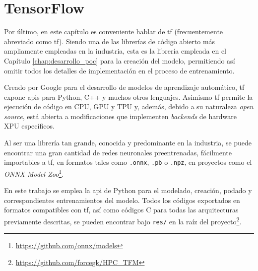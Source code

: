\section{TensorFlow}
\label{sec:tensorflow}
Por último, en este capítulo es conveniente hablar de \acrlong{tf} (frecuentemente abreviado como \acrshort{tf}). Siendo una de las librerías de código abierto más ampliamente empleadas en la industria, esta es la librería empleada en el Capítulo \ref{chap:desarrollo_poc} para la creación del modelo, permitiendo así omitir todos los detalles de implementación en el proceso de entrenamiento.

Creado por Google para el desarrollo de modelos de aprendizaje automático, \acrlong{tf} expone \acrshort{api}s para Python, C++ y muchos otros lenguajes. Asimismo \acrlong{tf} permite la ejecución de código en CPU, GPU y TPU y, además, debido a su naturaleza \textit{open source}, está abierta a modificaciones que implementen \textit{\gls{backend}s} de hardware XPU específicos.

Al ser una librería tan grande, conocida y predominante en la industria, se puede encontrar una gran cantidad de redes neuronales preentrenadas, fácilmente importables a \acrlong{tf}, en formatos tales como \texttt{.onnx}, \texttt{.pb} o \texttt{.npz}, en proyectos como el \textit{ONNX Model Zoo}\footnote{\url{https://github.com/onnx/models}}.

En este trabajo se emplea la \acrshort{api} de Python para el modelado, creación, podado y correspondientes entrenamientos del modelo. Todos los códigos exportados en formatos compatibles con \acrlong{tf}, así como códigos C para todas las arquitecturas previamente descritas, se pueden encontrar bajo \texttt{res/} en la raíz del proyecto\footnote{\url{https://github.com/forcegk/HPC_TFM}}.